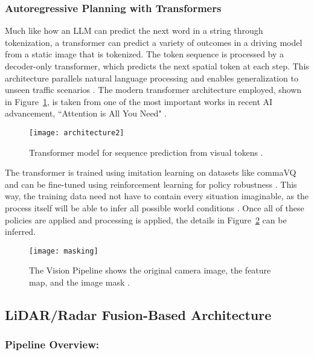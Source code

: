 \documentclass[12pt]{article}
\begin{document}
\subsubsection{Autoregressive Planning with Transformers}
Much like how an LLM can predict the next word in a string through tokenization,
a transformer can predict a variety of outcomes in a driving model from a static
image that is tokenized. The token sequence is processed by a decoder-only
transformer, which predicts the next spatial token at each step. This
architecture parallels natural language processing and enables generalization to
unseen traffic scenarios \cite{drivingsim}. The modern transformer architecture
employed, shown in Figure~\ref{fig:transformer}, is taken from one of the most
important works in recent AI advancement, ``Attention is All You Need"
\cite{vaswani2023attentionneed}.
\begin{figure}[H]
    \centering
    \texttt{[image: architecture2]}
    \caption{Transformer model for sequence prediction from visual tokens \autocite{vaswani2023attentionneed}.}
    \label{fig:transformer}
\end{figure}

The transformer is trained using imitation learning on datasets like commaVQ and
can be fine-tuned using reinforcement learning for policy robustness
\autocite{drivingsim}. This way, the training data need not have to contain
every situation imaginable, as the process itself will be able to infer all
possible world conditions \cite{goff2025learningdriveworldmodel}. Once all of
these policies are applied and processing is applied, the details in
Figure~\ref{fig:visionpipe} can be inferred.

\begin{figure}[H]
	\centering
	\texttt{[image: masking]}
	\caption{The Vision Pipeline shows the original camera image, the feature map,
	and the image mask \cite{wang2024}.}
	\label{fig:visionpipe}
\end{figure}

\subsection{LiDAR/Radar Fusion-Based Architecture}

\subsubsection{Pipeline Overview:}
\end{document}
